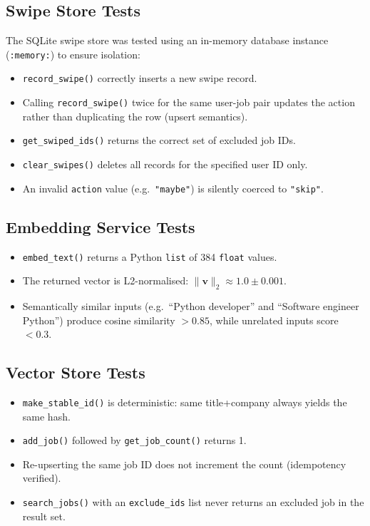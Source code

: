 \documentclass[12pt, a4paper, oneside]{report}
\begin{document}
\subsection*{Swipe Store Tests}

The SQLite swipe store was tested using an in-memory database instance
(\texttt{:memory:}) to ensure isolation:

\begin{itemize}[itemsep=3pt]
  \item \texttt{record\_swipe()} correctly inserts a new swipe record.
  \item Calling \texttt{record\_swipe()} twice for the same user-job pair updates the
        action rather than duplicating the row (upsert semantics).
  \item \texttt{get\_swiped\_ids()} returns the correct set of excluded job IDs.
  \item \texttt{clear\_swipes()} deletes all records for the specified user ID only.
  \item An invalid \texttt{action} value (e.g.\ \texttt{"maybe"}) is silently coerced to
        \texttt{"skip"}.
\end{itemize}

\subsection*{Embedding Service Tests}

\begin{itemize}[itemsep=3pt]
  \item \texttt{embed\_text()} returns a Python \texttt{list} of 384 \texttt{float} values.
  \item The returned vector is L2-normalised: $\|\mathbf{v}\|_2 \approx 1.0 \pm 0.001$.
  \item Semantically similar inputs (e.g.\ ``Python developer'' and ``Software engineer
        Python'') produce cosine similarity $> 0.85$, while unrelated inputs score $< 0.3$.
\end{itemize}

\subsection*{Vector Store Tests}

\begin{itemize}[itemsep=3pt]
  \item \texttt{make\_stable\_id()} is deterministic: same title+company always yields the
        same hash.
  \item \texttt{add\_job()} followed by \texttt{get\_job\_count()} returns 1.
  \item Re-upserting the same job ID does not increment the count (idempotency verified).
  \item \texttt{search\_jobs()} with an \texttt{exclude\_ids} list never returns an
        excluded job in the result set.
\end{itemize}
\end{document}
